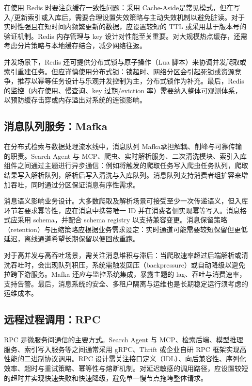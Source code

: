 在使用 Redis 时要注意缓存一致性问题：采用 Cache-Aside是常见模式，但在写入/更新索引或入库后，需要合理设置失效策略与主动失效机制以避免脏读。对于实时性强且在短时间内频繁更新的数据，应设置较短的 TTL 或采用基于版本号的验证机制。Redis 内存管理与 key 设计对性能至关重要。对大规模热点缓存，还需考虑分片策略与本地缓存结合，减少网络往返。

并发场景下，Redis 还可提供分布式锁与原子操作（Lua 脚本）来协调并发爬取或索引重建任务。但应谨慎使用分布式锁：锁超时、网络分区会引起死锁或资源竞争，推荐以幂等任务设计与乐观并发控制为主，分布式锁作为补充。最后，Redis 的监控（内存使用、慢查询、key 过期/eviction 率）需要纳入整体可观测体系，以预防缓存击穿或内存溢出对系统的连锁影响。

\subsection{消息队列服务：Mafka}
在分布式检索与数据处理流水线中，消息队列 Mafka\cite{CSDN2024Mafka}承担解耦、削峰与可靠传输的职责。Search Agent 与 MCP、爬虫、实时解析服务、二次清洗模块、索引入库组件之间通过主题进行异步通信：例如将触发的爬取任务写入爬虫任务队列，爬取结果写入解析队列，解析后写入清洗与入库队列。消息队列支持消费者组扩容来增加吞吐，同时通过分区保证消息有序性需求。

消息语义影响业务设计。大多数爬取及解析场景可接受至少一次传递语义，但入库环节若要求幂等性，应在消息中携带唯一 ID 并在消费者侧实现幂等写入。消息格式应采用 schema，并配合 schema registry 以支持兼容变更。消息保留策略（retention）与压缩策略应根据业务需求设定：实时通道可能需要较短保留但更低延迟，离线通道希望长期保留以便回放重跑。

对于高并发与高吞吐场景，需关注消息堆积与滞后：当爬取速率超过后端解析或清洗吞吐时，会出现队列积压，系统需触发回压（backpressure）或自动降级以避免拉跨下游服务。Mafka 还应与监控系统集成，暴露主题的 lag、吞吐与消费速率，支持告警。最后，消息系统的安全、多租户隔离与运维也是长期稳定运行须考虑的运维成本。

\subsection{远程过程调用：RPC}
RPC\cite{Tay1990RPC} 是微服务间通信的主要方式。Search Agent 与 MCP、检索后端、模型推理服务、索引写入服务等之间通常采用 gRPC、Thrift 或企业自研 RPC 框架实现高性能的二进制协议调用。RPC 设计需关注接口定义（IDL）、向后兼容性、序列化效率、超时与重试策略、幂等性与熔断机制。对延迟敏感的调用路径，应设置较短的超时并实现快速失败和快速降级，避免单一慢节点拖垮整体请求。

